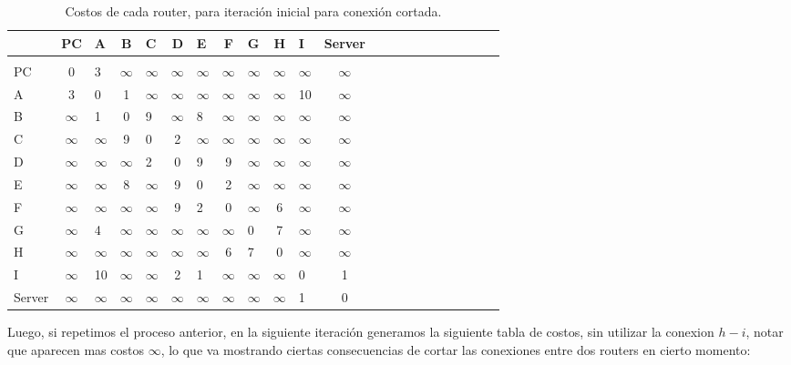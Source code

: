 \documentclass[a4papaer]{article}
\begin{document}
\begin{table}[h]
\centering
\begin{tabular}{lclclclclclclclclclclc}

& PC & A & B & C & D & E & F & G & H & I & Server \\\hline\\
PC&0&3&$\infty$&$\infty$&$\infty$&$\infty$&$\infty$&$\infty$&$\infty$&$\infty$&$\infty$ \\
A&3&0&1&$\infty$&$\infty$&$\infty$&$\infty$&$\infty$&$\infty$&10&$\infty$ \\
B&$\infty$&1&0&9&$\infty$&8&$\infty$&$\infty$&$\infty$&$\infty$&$\infty$ \\
C&$\infty$&$\infty$&9&0&2&$\infty$&$\infty$&$\infty$&$\infty$&$\infty$&$\infty$ \\
D&$\infty$&$\infty$&$\infty$&2&0&9&9&$\infty$&$\infty$&$\infty$&$\infty$ \\
E&$\infty$&$\infty$&8&$\infty$&9&0&2&$\infty$&$\infty$&$\infty$&$\infty$ \\
F&$\infty$&$\infty$&$\infty$&$\infty$&9&2&0&$\infty$&6&$\infty$&$\infty$ \\
G&$\infty$&4&$\infty$&$\infty$&$\infty$&$\infty$&$\infty$&0&7&$\infty$&$\infty$ \\
H&$\infty$&$\infty$&$\infty$&$\infty$&$\infty$&$\infty$&6&7&0&$\infty$&$\infty$ \\
I&$\infty$&10&$\infty$&$\infty$&2&1&$\infty$&$\infty$&$\infty$&0&1 \\
Server&$\infty$&$\infty$&$\infty$&$\infty$&$\infty$&$\infty$&$\infty$&$\infty$&$\infty$&1&0 \\

\end{tabular}
\caption{\label{tab:widgets}Costos de cada router, para iteración inicial para conexión cortada.}
\end{table}
 
Luego, si repetimos el proceso anterior, en la siguiente iteración generamos la siguiente tabla de costos, sin utilizar la conexion $h-i$, notar que aparecen mas costos $\infty$, lo que va mostrando ciertas consecuencias de cortar las conexiones entre dos routers en cierto momento:
\pagebreak
\end{document}
